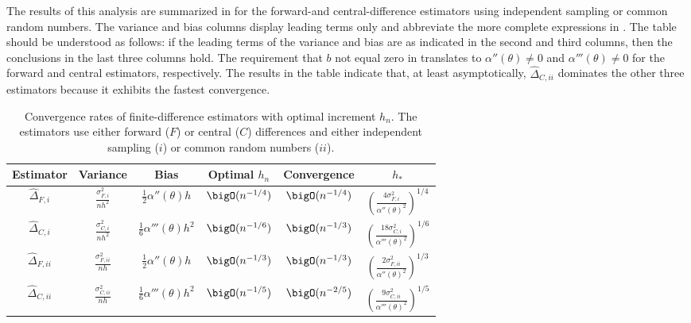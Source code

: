 The results of this analysis are summarized in  for the forward-and central-difference estimators using independent sampling or common random numbers. The variance and bias columns display leading terms only and abbreviate the more complete expressions in . The table should be understood as follows: if the leading terms of the variance and bias are as indicated in the second and third columns, then the conclusions in the last three columns hold. The requirement that $b$ not equal zero in  translates to $\alpha''(\theta) \neq 0$
and $\alpha'''(\theta) \neq 0$ for the forward and central estimators, respectively. The results in the table indicate that, at least asymptotically, $\hat{\Delta}_{C,ii}$ dominates the other three estimators because it exhibits the fastest convergence.

\begin{table}[H]
	\centering
	\caption{Convergence rates of finite-difference estimators with optimal increment $h_n$. The estimators use either forward ($F$) or central ($C$) differences and either independent sampling ($i$) or common random numbers ($ii$).}
	\label{tab:ConvergenceRates}
	\renewcommand{\arraystretch}{2.2}
	\begin{tabular}{cccccc}
		\toprule
		Estimator             & Variance                       & Bias                              & Optimal $h_n$     & Convergence       & $h_*$                                                             \\
		\midrule
		$\hat{\Delta}_{F,i}$  & $\frac{\sigma_{F,i}^2}{n h^2}$ & $\frac{1}{2}\alpha''(\theta)h$    & $\bigO(n^{-1/4})$ & $\bigO(n^{-1/4})$ & $\left(\frac{4\sigma_{F,i}^2}{\alpha''(\theta)^2}\right)^{1/4}$   \\
		$\hat{\Delta}_{C,i}$  & $\frac{\sigma_{C,i}^2}{n h^2}$ & $\frac{1}{6}\alpha'''(\theta)h^2$ & $\bigO(n^{-1/6})$ & $\bigO(n^{-1/3})$ & $\left(\frac{18\sigma_{C,i}^2}{\alpha'''(\theta)^2}\right)^{1/6}$ \\
		$\hat{\Delta}_{F,ii}$ & $\frac{\sigma_{F,ii}^2}{n h}$  & $\frac{1}{2}\alpha''(\theta)h$    & $\bigO(n^{-1/3})$ & $\bigO(n^{-1/3})$ & $\left(\frac{2\sigma_{F,ii}^2}{\alpha''(\theta)^2}\right)^{1/3}$  \\
		$\hat{\Delta}_{C,ii}$ & $\frac{\sigma_{C,ii}^2}{n h}$  & $\frac{1}{6}\alpha'''(\theta)h^2$ & $\bigO(n^{-1/5})$ & $\bigO(n^{-2/5})$ & $\left(\frac{9\sigma_{C,ii}^2}{\alpha'''(\theta)^2}\right)^{1/5}$ \\
		\bottomrule
	\end{tabular}
\end{table}

